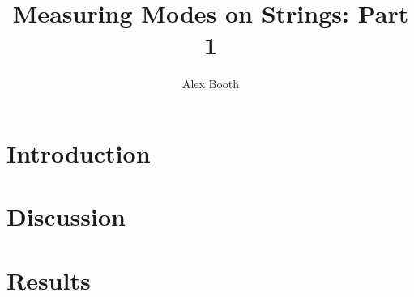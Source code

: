 \documentclass{article}
\title{Measuring Modes on Strings: Part 1}
\author{Alex Booth}
\begin{document}
    \maketitle

    \section{Introduction}
    
    \section{Discussion}

    \section{Results}
\end{document}
